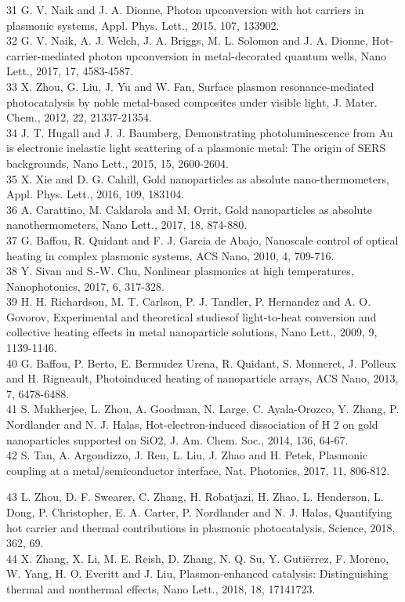 \documentclass[10pt]{article}
\begin{document}
31 G. V. Naik and J. A. Dionne, Photon upconversion with hot carriers in plasmonic systems, Appl. Phys. Lett., 2015, 107, 133902.\\
32 G. V. Naik, A. J. Welch, J. A. Briggs, M. L. Solomon and J. A. Dionne, Hot-carrier-mediated photon upconversion in metal-decorated quantum wells, Nano Lett., 2017, 17, 4583-4587.\\
33 X. Zhou, G. Liu, J. Yu and W. Fan, Surface plasmon resonance-mediated photocatalysis by noble metal-based composites under visible light, J. Mater. Chem., 2012, 22, 21337-21354.\\
34 J. T. Hugall and J. J. Baumberg, Demonstrating photoluminescence from Au is electronic inelastic light scattering of a plasmonic metal: The origin of SERS backgrounds, Nano Lett., 2015, 15, 2600-2604.\\
35 X. Xie and D. G. Cahill, Gold nanoparticles as absolute nano-thermometers, Appl. Phys. Lett., 2016, 109, 183104.\\
36 A. Carattino, M. Caldarola and M. Orrit, Gold nanoparticles as absolute nanothermometers, Nano Lett., 2017, 18, 874-880.\\
37 G. Baffou, R. Quidant and F. J. Garcia de Abajo, Nanoscale control of optical heating in complex plasmonic systems, ACS Nano, 2010, 4, 709-716.\\
38 Y. Sivan and S.-W. Chu, Nonlinear plasmonics at high temperatures, Nanophotonics, 2017, 6, 317-328.\\
39 H. H. Richardson, M. T. Carlson, P. J. Tandler, P. Hernandez and A. O. Govorov, Experimental and theoretical studiesof light-to-heat conversion and collective heating effects in metal nanoparticle solutions, Nano Lett., 2009, 9, 1139-1146.\\
40 G. Baffou, P. Berto, E. Bermudez Urena, R. Quidant, S. Monneret, J. Polleux and H. Rigneault, Photoinduced heating of nanoparticle arrays, ACS Nano, 2013, 7, 6478-6488.\\
41 S. Mukherjee, L. Zhou, A. Goodman, N. Large, C. Ayala-Orozco, Y. Zhang, P. Nordlander and N. J. Halas, Hot-electron-induced dissociation of H 2 on gold nanoparticles supported on SiO2, J. Am. Chem. Soc., 2014, 136, 64-67.\\
42 S. Tan, A. Argondizzo, J. Ren, L. Liu, J. Zhao and H. Petek, Plasmonic coupling at a metal/semiconductor interface, Nat. Photonics, 2017, 11, 806-812.

43 L. Zhou, D. F. Swearer, C. Zhang, H. Robatjazi, H. Zhao, L. Henderson, L. Dong, P. Christopher, E. A. Carter, P. Nordlander and N. J. Halas, Quantifying hot carrier and thermal contributions in plasmonic photocatalysis, Science, 2018, 362, 69.\\
44 X. Zhang, X. Li, M. E. Reish, D. Zhang, N. Q. Su, Y. Gutiërrez, F. Moreno, W. Yang, H. O. Everitt and J. Liu, Plasmon-enhanced catalysis: Distinguishing thermal and nonthermal effects, Nano Lett., 2018, 18, 17141723.
\end{document}
